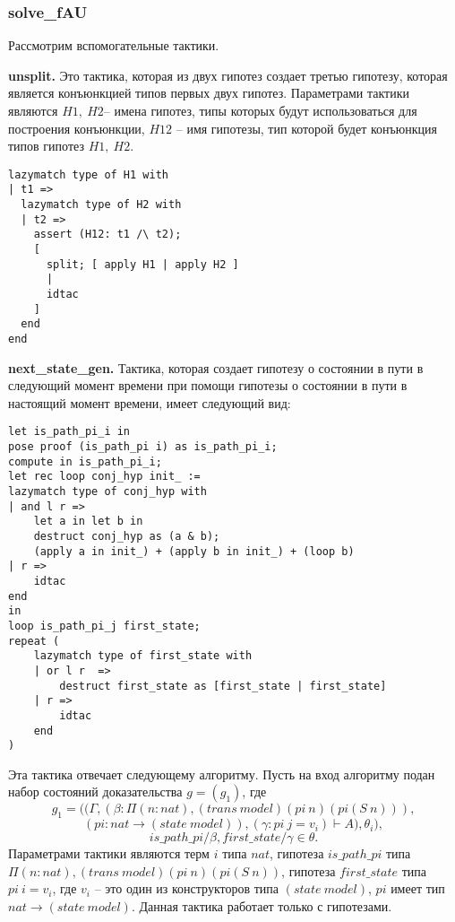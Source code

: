 \documentclass[12pt]{article}
\begin{document}
\subsubsection{solve\_fAU}
Рассмотрим вспомогательные тактики.

\textbf{unsplit.} 
Это тактика, которая из двух гипотез создает третью гипотезу, которая является конъюнкцией типов первых двух гипотез.
Параметрами тактики являются $H1,\ H2$-- имена гипотез, типы которых будут использоваться для построения конъюнкции, $H12$ -- имя гипотезы, тип которой будет конъюнкция типов гипотез $H1,\ H2.$
\begin{verbatim}
lazymatch type of H1 with
| t1 => 
  lazymatch type of H2 with 
  | t2 => 
    assert (H12: t1 /\ t2);
    [
      split; [ apply H1 | apply H2 ]
      | 
      idtac
    ]
  end
end
\end{verbatim}

\textbf{next\_state\_gen.} 
Тактика, которая создает гипотезу о состоянии в пути в следующий момент времени при помощи гипотезы о состоянии в пути в настоящий момент времени, имеет следующий вид:

\begin{verbatim}
let is_path_pi_i in
pose proof (is_path_pi i) as is_path_pi_i;
compute in is_path_pi_i;
let rec loop conj_hyp init_ :=
lazymatch type of conj_hyp with
| and l r => 
    let a in let b in
    destruct conj_hyp as (a & b);
    (apply a in init_) + (apply b in init_) + (loop b)
| r => 
    idtac
end
in
loop is_path_pi_j first_state;
repeat (
    lazymatch type of first_state with
    | or l r  =>
        destruct first_state as [first_state | first_state]
    | r => 
        idtac
    end
)
\end{verbatim}

Эта тактика отвечает следующему алгоритму.
Пусть на вход алгоритму подан набор состояний доказательства $g = (g_1)$, где 
$$g_1 = ((\Gamma,(\beta:\Pi (n : nat), (trans\ model) (pi\ n) (pi (S\ n))), $$
$$(pi: nat \xrightarrow{} (state\ model)),(\gamma:pi\ j = v_i)  \vdash A), \theta_i), $$
$$is\_path\_pi/\beta,first\_state/\gamma \in \theta.$$ 
Параметрами тактики являются терм $i$ типа $nat$, гипотеза $is\_path\_pi$ типа $\Pi (n : nat), (trans\ model) (pi\ n) (pi (S\ n))$,  гипотеза $first\_state$ типа $pi\ i = v_i$, где $v_i$ -- это один из конструкторов типа $(state\ model)$, $pi$ имеет тип $nat \xrightarrow{} (state\ model)$. Данная тактика работает только с гипотезами.
\end{document}
